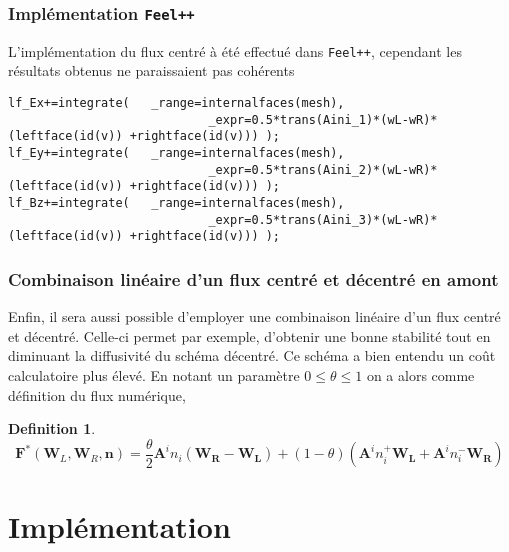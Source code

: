 \documentclass[a4paper,oneside,10pt]{report}
\newtheorem{mydef}{Definition}
\begin{document}
\subsubsection{Implémentation \texttt{Feel++}}
L'implémentation du flux centré à été effectué dans \texttt{Feel++}, cependant les résultats obtenus ne paraissaient pas cohérents
\begin{center}
\begin{minipage}{\textwidth}
\begin{lstlisting}[label=code2,caption=calcul du flux numerique decentre: assemble\_RHS()]
lf_Ex+=integrate( 	_range=internalfaces(mesh),
							_expr=0.5*trans(Aini_1)*(wL-wR)*(leftface(id(v)) +rightface(id(v))) );
lf_Ey+=integrate( 	_range=internalfaces(mesh),
							_expr=0.5*trans(Aini_2)*(wL-wR)*(leftface(id(v)) +rightface(id(v))) );
lf_Bz+=integrate( 	_range=internalfaces(mesh),
							_expr=0.5*trans(Aini_3)*(wL-wR)*(leftface(id(v)) +rightface(id(v))) );
\end{lstlisting}
\end{minipage}
\end{center}



\subsubsection{Combinaison linéaire d'un flux centré et décentré en amont}

Enfin, il sera aussi possible d'employer une combinaison linéaire d'un flux centré et décentré. Celle-ci permet par exemple, d'obtenir une bonne stabilité tout en diminuant la diffusivité du schéma décentré. Ce schéma a bien entendu un coût calculatoire plus élevé. En notant un paramètre $0 \leq \theta \leq 1$ on a alors comme définition du flux numérique,

\begin{mydef}
\begin{equation}
 \mathbf{F}^*( \mathbf{W}_L,\mathbf{W}_R,\mathbf{n})  = \frac{\theta}{2}\mathbf{A}^i n_i(\mathbf{W_R} - \mathbf{W_L}) + (1 -\theta)(\mathbf{A}^i n_i^+\mathbf{W_L} + \mathbf{A}^i n_i^-\mathbf{W_R})
 \end{equation}
\end{mydef}





\section{Implémentation}
\end{document}
